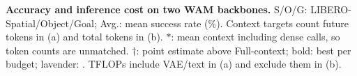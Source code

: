 \begin{table}[t]
  \centering
\caption{\textbf{Accuracy and inference cost on two WAM backbones.}
S/O/G: LIBERO-Spatial/Object/Goal; Avg.: mean success rate (\%).
Context targets count future tokens in (a) and total tokens in (b).
$*$: mean context including dense calls, so token counts are unmatched.
$\dagger$: point estimate above Full-context; bold: best per budget;
lavender: \method.
TFLOPs include VAE/text in (a) and exclude them in (b).}
\label{tab:main_results}
  \renewcommand{\TODO}[1]{{\color{red}--}}


  


\end{table}
